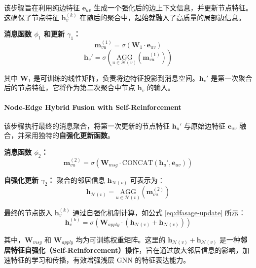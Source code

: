 \documentclass{article}
\begin{document}
该步骤旨在利用纯边特征 $\mathbf{e}_{uv}$ 生成一个强化后的边上下文信息，并更新节点特征。这确保了节点特征 $\mathbf{h}_v^{(k)}$ 在随后的聚合中，起始就融入了高质量的局部边信息。

\textbf{消息函数 $\phi_1$ 和更新 $\gamma_1$：}
$$
\mathbf{m}_{vu}^{(1)} = \sigma \left( \mathbf{W}_{1} \cdot \mathbf{e}_{uv} \right)
$$
\begin{equation}
\mathbf{h}_v' = \sigma \left( \underset{u \in \mathcal{N}(v)}{\text{AGG}} (\mathbf{m}_{vu}^{(1)}) \right)
\end{equation}

其中 $\mathbf{W}_{1}$ 是可训练的线性矩阵，负责将边特征投影到消息空间。$\mathbf{h}_v'$ 是第一次聚合后的节点特征，它将作为第二次聚合中节点 $\mathbf{h}_v$ 的输入。

\paragraph{Node-Edge Hybrid Fusion with Self-Reinforcement}

该步骤执行最终的消息聚合，将第一次更新的节点特征 $\mathbf{h}_u'$ 与原始边特征 $\mathbf{e}_{uv}$ 融合，并采用独特的\textbf{自强化更新函数}。

\textbf{消息函数 $\phi_2$：}
$$
\mathbf{m}_{vu}^{(2)} = \sigma \left( \mathbf{W}_{msg} \cdot \text{CONCAT}(\mathbf{h}_u', \mathbf{e}_{uv}) \right)
$$

\textbf{自强化更新 $\gamma_2$：}
聚合的邻居信息 $\mathbf{h}_{\mathcal{N}(v)}$ 可表示为：
$$
\mathbf{h}_{\mathcal{N}(v)} = \underset{u \in \mathcal{N}(v)}{\text{AGG}} (\mathbf{m}_{vu}^{(2)})
$$

最终的节点嵌入 $\mathbf{h}_v^{(k)}$ 通过自强化机制计算，如公式 \eqref{eq:dfasage-update} 所示：
\begin{equation}
\mathbf{h}_v^{(k)} = \sigma \left( \mathbf{W}_{apply} \cdot (\mathbf{h}_{\mathcal{N}(v)} + \mathbf{h}_{\mathcal{N}(v)}) \right)
\label{eq:dfasage-update}
\end{equation}

其中，$\mathbf{W}_{msg}$ 和 $\mathbf{W}_{apply}$ 均为可训练权重矩阵。这里的 $\mathbf{h}_{\mathcal{N}(v)} + \mathbf{h}_{\mathcal{N}(v)}$ 是一种\textbf{邻居特征自强化（Self-Reinforcement）}操作，旨在通过放大邻居信息的影响，加速特征的学习和传播，有效增强浅层 GNN 的特征表达能力。

\end{document}
